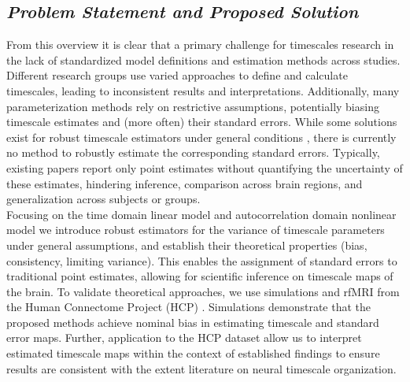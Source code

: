 \documentclass[latex/main.tex]{subfiles}
\begin{document}
\subsection{\textit{Problem Statement and Proposed Solution}}
From this overview it is clear that a primary challenge for timescales research in the lack of standardized model definitions and estimation methods across studies. Different research groups use varied approaches to define and calculate timescales, leading to inconsistent results and interpretations. Additionally, many parameterization methods rely on restrictive assumptions, potentially biasing timescale estimates and (more often) their standard errors. While some solutions exist for robust timescale estimators under general conditions \citep{zeraati_flexible_2022, donoghue_parameterizing_2020, gao_neuronal_2020}, there is currently no method to robustly estimate the corresponding standard errors. Typically, existing papers report only point estimates without quantifying the uncertainty of these estimates, hindering inference, comparison across brain regions, and generalization across subjects or groups.\\

Focusing on the time domain linear model and autocorrelation domain nonlinear model we introduce robust estimators for the variance of timescale parameters under general assumptions, and establish their theoretical properties (bias, consistency, limiting variance). This enables the assignment of standard errors to traditional point estimates, allowing for scientific inference on timescale maps of the brain. To validate theoretical approaches, we use simulations and rfMRI from the Human Connectome Project (HCP) \citep{van_essen_wu-minn_2013}. Simulations demonstrate that the proposed methods achieve nominal bias in estimating timescale and standard error maps. Further, application to the HCP dataset allow us to interpret estimated timescale maps within the context of established findings to ensure results are consistent with the extent literature on neural timescale organization.\\
\end{document}
